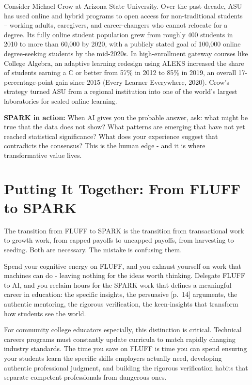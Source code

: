 \documentclass[
  letterpaper,
  DIV=11,
  numbers=noendperiod]{scrreprt}
\begin{document}
Consider Michael Crow at Arizona State University. Over the past decade,
ASU has used online and hybrid programs to open access for
non-traditional students -- working adults, caregivers, and
career-changers who cannot relocate for a degree. Its fully online
student population grew from roughly 400 students in 2010 to more than
60,000 by 2020, with a publicly stated goal of 100,000 online
degree-seeking students by the mid-2020s. In high-enrollment gateway
courses like College Algebra, an adaptive learning redesign using ALEKS
increased the share of students earning a C or better from 57\% in 2012
to 85\% in 2019, an overall 17-percentage-point gain since 2015 (Every
Learner Everywhere, 2020). Crow's strategy turned ASU from a regional
institution into one of the world's largest laboratories for scaled
online learning.

\textbf{SPARK in action:} When AI gives you the probable answer, ask:
what might be true that the data does not show? What patterns are
emerging that have not yet reached statistical significance? What does
your experience suggest that contradicts the consensus? This is the
human edge - and it is where transformative value lives.

\section{Putting It Together: From FLUFF to
SPARK}\label{putting-it-together-from-fluff-to-spark}

The transition from FLUFF to SPARK is the transition from transactional
work to growth work, from capped payoffs to uncapped payoffs, from
harvesting to seeding. Both are necessary. The mistake is confusing
them.

Spend your cognitive energy on FLUFF, and you exhaust yourself on work
that machines can do - leaving nothing for the ideas worth thinking.
Delegate FLUFF to AI, and you reclaim hours for the SPARK work that
defines a meaningful career in education: the specific insights, the
persuasive {[}p.~14{]} arguments, the authentic mentoring, the rigorous
verification, the keen-insights that transform how students see the
world.

For community college educators especially, this distinction is
critical. Technical careers programs must constantly update curricula to
match rapidly changing industry standards. The time you save on FLUFF is
time you can spend ensuring your students learn the specific skills
employers actually need, developing authentic professional judgment, and
building the rigorous verification habits that separate competent
professionals from dangerous ones.
\end{document}
